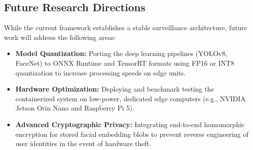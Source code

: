 \documentclass[12pt,a4paper]{article}
\begin{document}
\subsection{Future Research Directions}
While the current framework establishes a stable surveillance architecture, future work will address the following areas:
\begin{itemize}
    \item \textbf{Model Quantization:} Porting the deep learning pipelines (YOLOv8, FaceNet) to ONNX Runtime and TensorRT formats using FP16 or INT8 quantization to increase processing speeds on edge units.
    \item \textbf{Hardware Optimization:} Deploying and benchmark testing the containerized system on low-power, dedicated edge computers (e.g., NVIDIA Jetson Orin Nano and Raspberry Pi 5).
    \item \textbf{Advanced Cryptographic Privacy:} Integrating end-to-end homomorphic encryption for stored facial embedding blobs to prevent reverse engineering of user identities in the event of hardware theft.
\end{itemize}

\newpage

\printbibliography
\end{document}
